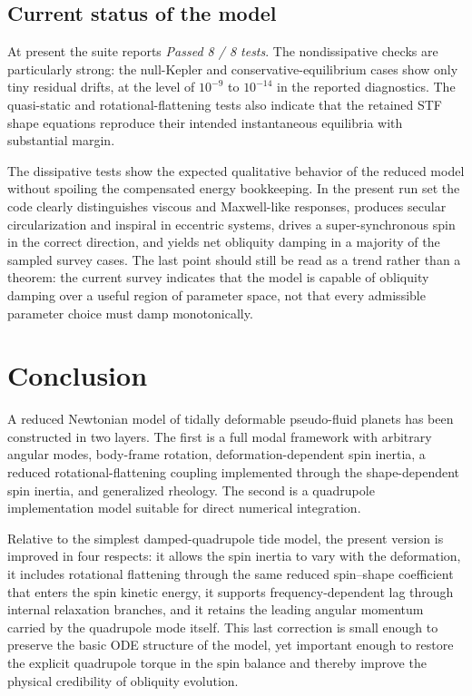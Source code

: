 \documentclass[journal, a4paper]{IEEEtran}
\begin{document}
\subsection{Current status of the model}

At present the suite reports \emph{Passed 8 / 8 tests}. The nondissipative
checks are particularly strong: the null-Kepler and conservative-equilibrium
cases show only tiny residual drifts, at the level of $10^{-9}$ to $10^{-14}$
in the reported diagnostics. The quasi-static and rotational-flattening tests
also indicate that the retained STF shape equations reproduce their intended
instantaneous equilibria with substantial margin.

The dissipative tests show the expected qualitative behavior of the reduced
model without spoiling the compensated energy bookkeeping. In the present run
set the code clearly distinguishes viscous and Maxwell-like responses,
produces secular circularization and inspiral in eccentric systems, drives a
super-synchronous spin in the correct direction, and yields net obliquity
damping in a majority of the sampled survey cases. The last point should still
be read as a trend rather than a theorem: the current survey indicates that the
model is capable of obliquity damping over a useful region of parameter space,
not that every admissible parameter choice must damp monotonically.

\section{Conclusion}

A reduced Newtonian model of tidally deformable pseudo-fluid planets has been
constructed in two layers. The first is a full modal framework with arbitrary
angular modes, body-frame rotation, deformation-dependent spin inertia, a
reduced rotational-flattening coupling implemented through the
shape-dependent spin inertia, and generalized rheology. The second is a quadrupole implementation model
suitable for direct numerical integration.

Relative to the simplest damped-quadrupole tide model, the present version is
improved in four respects: it allows the spin inertia to vary with
the deformation, it includes rotational flattening through the same reduced
spin--shape coefficient that enters the spin kinetic energy, it supports
frequency-dependent lag through internal relaxation branches, and it retains
the leading angular momentum carried by the quadrupole mode itself. This last
correction is small enough to preserve the basic ODE structure of the model,
yet important enough to restore the explicit quadrupole torque in the spin
balance and thereby improve the physical credibility of obliquity evolution.
\end{document}
